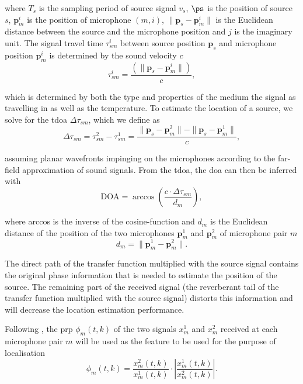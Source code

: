 where $T_s$ is the sampling period of source signal $v_s$, $\ps$ is the position of source $s$, $\bm p^i_m$ is the position of microphone $(m,i)$, $\|\bm p_s-\bm p_m^i\|$ is the Euclidean distance between the source and the microphone position and $j$ is the imaginary unit. The signal travel time $\tau^i_{sm}$ between source position $\bm p_s$ and microphone position $\bm p^i_m$ is determined by the sound velocity $c$
\begin{equation}
	\tau^i_{sm}=\frac{\left(\|\bm p_s-\bm p_m^i\|\right)}{c},
\end{equation}

which is determined by both the type and properties of the medium the signal as travelling in as well as the temperature. To estimate the location of a source, we solve for the \gls{tdoa} $\Delta\tau_{sm}$, which we define as
\begin{equation}
    \Delta\tau_{sm}=\tau^2_{sm}-\tau^1_{sm}=\frac{\|\bm p_s-\bm p_m^2\|-\|\bm p_s-\bm p_m^1\|}{c},
\end{equation}

assuming planar wavefronts impinging on the microphones according to the far-field approximation of sound signals. From the \gls{tdoa}, the \gls{doa} can then be inferred with
\begin{equation}
    \text{DOA}=\arccos\left (\frac{c\cdot \Delta\tau_{sm}}{d_m}\right ),
\end{equation}

where arccos is the inverse of the cosine-function and $d_m$ is the Euclidean distance of the position of the two microphones $\bm p_m^1$ and $\bm p_m^2$ of microphone pair $m$
\begin{equation}
    d_m=\| \bm p_m^1-\bm p_m^2\|.
\end{equation}

The direct path of the transfer function multiplied with the source signal contains the original phase information that is needed to estimate the position of the source. The remaining part of the received signal (the reverberant tail of the transfer function multiplied with the source signal) distorts this information and will decrease the location estimation performance. 

Following \cite{Schwartz2014}, the \gls{prp} $\phi_{m}(t,k)$ of the two signals $x_{m}^1$ and $x_{m}^2$ received at each microphone pair $m$ will be used as the feature to be used for the purpose of localisation
\begin{equation}
    \phi_{m}(t,k)=\frac{x^2_{m}(t,k)}{x^1_{m}(t,k)}\cdot \left |\frac{x^1_{m}(t,k)}{x^2_{m}(t,k)}\right |.
\label{eq:prp}
\end{equation}

